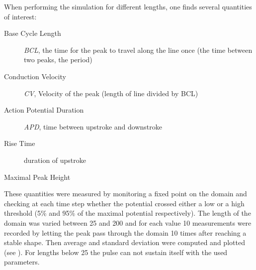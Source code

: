 When performing the simulation for different lengths, one finds several
quantities of interest:
\begin{description}
    \item[Base Cycle Length] \emph{BCL}, the time for the peak to travel along
        the line once (the time between two peaks, the period)
    \item[Conduction Velocity] \emph{CV}, Velocity of the peak (length of line
        divided by BCL)
    \item[Action Potential Duration] \emph{APD}, time between upstroke and
        downstroke
    \item[Rise Time] duration of upstroke
    \item[Maximal Peak Height]
\end{description}

These quantities were measured by monitoring a fixed point on the domain and
checking at each time step whether the potential crossed either a low or a high
threshold (5\% and 95\% of the maximal potential respectively).
The length of the domain was varied between 25 and 200 and for each value 10
measurements were recorded by letting the peak pass through the domain 10 times after
reaching a stable shape. Then average and standard deviation were computed and
plotted (see ).
For lengths below 25 the pulse can not sustain itself with the used parameters.

